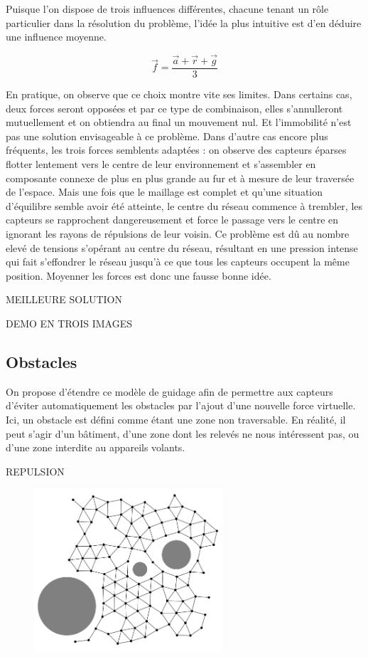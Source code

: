 \documentclass[10pt]{article}
\begin{document}
\begin{multicols}{2}
Puisque l'on dispose de trois influences différentes, chacune tenant
un rôle particulier dans la résolution du problème, l'idée la plus
intuitive est d'en déduire une influence moyenne.

$$
\vec{f} = \frac{\vec{a} + \vec{r} + \vec{g}}{3}
$$

En pratique, on observe que ce choix montre vite ses limites. Dans
certains cas, deux forces seront opposées et par ce type de
combinaison, elles s'annulleront mutuellement et on obtiendra au final
un mouvement nul. Et l'immobilité n'est pas une solution envisageable
à ce problème. Dans d'autre cas encore plus fréquents, les trois
forces semblents adaptées : on observe des capteurs éparses flotter
lentement vers le centre de leur environnement et s'assembler en
composante connexe de plus en plus grande au fur et à mesure de leur
traversée de l'espace. Mais une fois que le maillage est complet et
qu'une situation d'équilibre semble avoir été atteinte, le centre du
réseau commence à trembler, les capteurs se rapprochent dangereusement
et force le passage vers le centre en ignorant les rayons de
répulsions de leur voisin. Ce problème est dû au nombre elevé de
tensions s'opérant au centre du réseau, résultant en une pression
intense qui fait s'effondrer le réseau jusqu'à ce que tous les
capteurs occupent la même position. Moyenner les forces est donc une
fausse bonne idée.

MEILLEURE SOLUTION

DEMO EN TROIS IMAGES

\subsection{Obstacles}

On propose d'étendre ce modèle de guidage afin de permettre aux
capteurs d'éviter automatiquement les obstacles par l'ajout d'une
nouvelle force virtuelle. Ici, un obstacle est défini comme étant une
zone non traversable. En réalité, il peut s'agir d'un bâtiment, d'une
zone dont les relevés ne nous intéressent pas, ou d'une zone interdite
au appareils volants.

REPULSION

\begin{figure}[H]

  \centering

  \includegraphics[width=7cm]{obstacles.png}


\end{figure}
\end{multicols}
\end{document}
